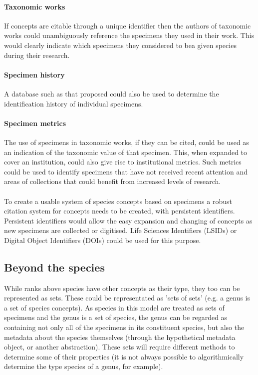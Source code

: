 \documentclass{article}
\begin{document}
   \paragraph{Taxonomic works}
   If concepts are citable through a unique identifier then the authors of taxonomic works could unambiguously reference the specimens they used in their work. This would clearly indicate which specimens they considered to bea given species during their research.
   
   \paragraph{Specimen history}
   A database such as that proposed could also be used to determine the identification history of individual specimens.
   
   \paragraph{Specimen metrics}
   The use of specimens in taxonomic works, if they can be cited, could be used as an indication of the taxonomic value of that specimen. This, when expanded to cover an institution, could also give rise to institutional metrics. Such metrics could be used to identify specimens that have not received recent attention and areas of collections that could benefit from increased levels of research.
   
   \paragraph{}
   To create a usable system of species concepts based on specimens a robust citation system for concepts needs to be created, with persistent identifiers. Persistent identifiers would allow the easy expansion and changing of concepts as new specimens are collected or digitised. Life Sciences Identifiers (LSIDs) or Digital Object Identifiers (DOIs) could be used for this purpose.
   
   \subsection{Beyond the species}
   While ranks above species have other concepts as their type, they too can be represented as sets. These could be representated as 'sets of sets' (e.g. a genus is a set of species concepts). As species in this model are treated as sets of specimens and the genus is a set of species, the genus can be regarded as containing not only all of the specimens in its constituent species, but also the metadata about the species themselves (through the hypothetical metadata object, or another abstraction). These sets will require different methods to determine some of their properties (it is not always possible to algorithmically determine the type species of a genus, for example).
   
\end{document}
